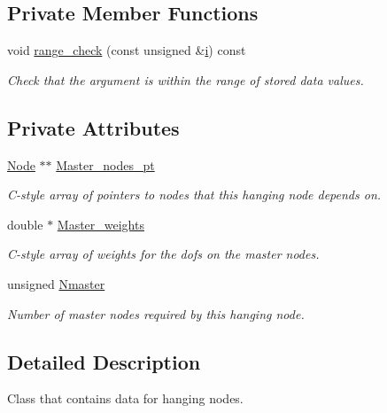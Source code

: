 \subsection*{Private Member Functions}
\begin{DoxyCompactItemize}
\item 
void \hyperlink{classoomph_1_1HangInfo_a7aaef82d109bb5daed0721402e97afe8}{range\+\_\+check} (const unsigned \&\hyperlink{cfortran_8h_adb50e893b86b3e55e751a42eab3cba82}{i}) const
\begin{DoxyCompactList}\small\item\em Check that the argument is within the range of stored data values. \end{DoxyCompactList}\end{DoxyCompactItemize}
\subsection*{Private Attributes}
\begin{DoxyCompactItemize}
\item 
\hyperlink{classoomph_1_1Node}{Node} $\ast$$\ast$ \hyperlink{classoomph_1_1HangInfo_aa2bceeaff9247520fdd786f612237a18}{Master\+\_\+nodes\+\_\+pt}
\begin{DoxyCompactList}\small\item\em C-\/style array of pointers to nodes that this hanging node depends on. \end{DoxyCompactList}\item 
double $\ast$ \hyperlink{classoomph_1_1HangInfo_ac9edb46a1890f19fb4dfc02c652cd398}{Master\+\_\+weights}
\begin{DoxyCompactList}\small\item\em C-\/style array of weights for the dofs on the master nodes. \end{DoxyCompactList}\item 
unsigned \hyperlink{classoomph_1_1HangInfo_a9e256dac82251e6167bd7a763fe4e134}{Nmaster}
\begin{DoxyCompactList}\small\item\em Number of master nodes required by this hanging node. \end{DoxyCompactList}\end{DoxyCompactItemize}


\subsection{Detailed Description}
Class that contains data for hanging nodes. 

